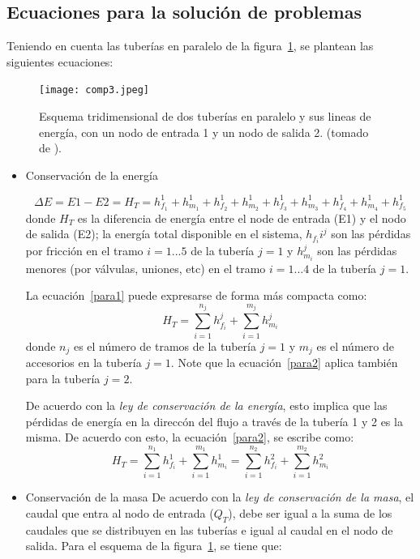 \documentclass[10pt, oneside]{article}
\begin{document}
\subsection{Ecuaciones para la soluci\'on de problemas}
Teniendo en cuenta las tuber\'ias en paralelo de la figura~\ref{comp3}, se plantean las siguientes ecuaciones:
\begin{figure}[h]
\centering
\texttt{[image: comp3.jpeg]}
\caption{Esquema tridimensional de dos tuber\'ias en paralelo y sus lineas de energ\'ia, con un nodo de entrada 1 y un nodo de salida 2. (tomado de \cite{saldarriaga}).} 
\label{comp3}
\end{figure}

\begin{itemize}
\item Conservaci\'on de la energ\'ia

\begin{equation}
\Delta E = E1-E2 = H_T = h_{f_1}^1 + h_{m_1}^1 + h_{f_2}^1 + h_{m_2}^1 + h_{f_3}^1 + h_{m_3}^1 + h_{f_4}^1 + h_{m_4}^1 + h_{f_5}^1
\label{para1}
\end{equation}
donde $H_T$ es la diferencia de energ\'ia entre el node de entrada (E1) y el nodo de salida (E2); la energ\'ia total disponible en el sistema, $h_{f_i}i^j$ son las p\'erdidas por fricci\'on en el tramo $i=1...5$ de la tuber\'ia $j=1$ y $h_{m_i}^j$ son las p\'erdidas menores (por v\'alvulas, uniones, etc) en el tramo $i=1...4$ de la tuber\'ia $j=1$.

La ecuaci\'on~\ref{para1} puede expresarse de forma m\'as compacta como:
\begin{equation}
H_T = \sum_{i=1}^{n_j} h_{f_i}^j + \sum_{i=1}^{m_j} h_{m_i}^j
\label{para2}
\end{equation}
donde $n_j$ es el n\'umero de tramos de la tuber\'ia $j=1$ y $m_j$ es el n\'umero de accesorios en la tuber\'ia $j=1$. Note que la ecuaci\'on~\ref{para2} aplica tambi\'en para la tuber\'ia $j=2$.

De acuerdo con la \emph{ley de conservaci\'on de la energ\'ia}, esto implica que las p\'erdidas de energ\'ia en la direcc\'on del flujo a trav\'es de la tuber\'ia 1 y 2 es la misma. De acuerdo con esto, la ecuaci\'on~\ref{para2}, se escribe como:
\begin{equation}
H_T = \sum_{i=1}^{n_1} h_{f_i}^1 + \sum_{i=1}^{m_1} h_{m_i}^1 = \sum_{i=1}^{n_2} h_{f_i}^2 + \sum_{i=1}^{m_2} h_{m_i}^2
\label{para3}
\end{equation}

\item Conservaci\'on de la masa
De acuerdo con la \emph{ley de conservaci\'on de la masa}, el caudal que entra al nodo de entrada ($Q_T$), debe ser igual a la suma de los caudales que se distribuyen en las tuber\'ias e igual al caudal en el nodo de salida. Para el esquema de la figura~\ref{comp3}, se tiene que:


\end{itemize}
\end{document}
